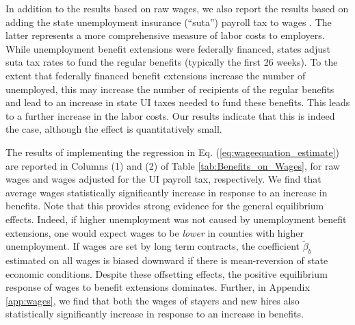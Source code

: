 \documentclass[12pt]{article}
\newcommand{\1}{\mathbf{1}}
\begin{document}
In addition to the results based on raw wages, we also report the results based on adding the state unemployment insurance (``suta'') payroll tax to wages \citep{data:doleta-hb394}. The latter represents a more comprehensive measure of labor costs to employers. While unemployment benefit extensions were federally financed, states adjust suta tax rates to fund the regular benefits (typically the first 26 weeks). To the extent that federally financed benefit extensions increase the number of unemployed, this may increase the number of recipients of the regular benefits and lead to an increase in state UI taxes needed to fund these benefits. This leads to a further increase in the labor costs. Our results indicate that this is indeed the case, although the effect is quantitatively small.


The results of implementing the regression in Eq. (\ref{eq:wageequation_estimate}) are reported in Columns (1) and (2) of Table \ref{tab:Benefits_on_Wages}, for raw wages and wages adjusted for the UI payroll tax, respectively. We find that average wages statistically significantly increase in response to an increase in benefits. Note that this provides strong evidence for the general equilibrium effects. Indeed, if higher unemployment was not caused by unemployment benefit extensions, one would expect wages to be \emph{lower} in counties with higher unemployment. If wages are set by long term contracts, the coefficient $\tilde{\beta}_b$ estimated on all wages is biased downward if there is mean-reversion of state economic conditions. Despite these offsetting effects, the positive equilibrium response of wages to benefit extensions dominates. Further, in Appendix \ref{app:wages}, we find that both the wages of stayers and new hires also statistically significantly increase in response to an increase in benefits.
\end{document}
